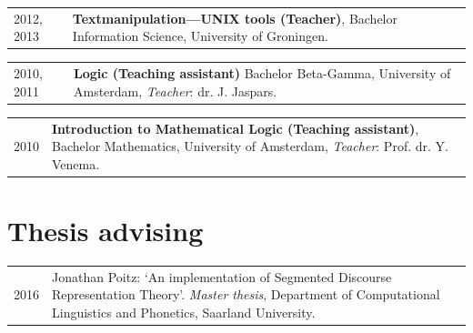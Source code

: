 \documentclass[a4paper,10pt]{article}
\def\leftcolwidth{.12\textwidth}
\def\tablevspace{10pt}
\begin{document}
\noindent
\begin{tabularx}{\textwidth}{ p{\leftcolwidth} X }
  2012, 2013
  & \textbf{Textmanipulation---UNIX tools (Teacher)}, 
    Bachelor Information Science, University of Groningen.\\
\end{tabularx}

\vspace{\tablevspace}

\vspace{\tablevspace}

\noindent
\begin{tabularx}{\textwidth}{ p{\leftcolwidth} X }
  2010, 2011
  & \textbf{Logic (Teaching assistant)}
    Bachelor Beta-Gamma, University of Amsterdam,
    \textit{Teacher}: dr. J. Jaspars.
\end{tabularx}

\vspace{\tablevspace}

\noindent
\begin{tabularx}{\textwidth}{ p{\leftcolwidth} X }
  2010
  & \textbf{Introduction to Mathematical Logic (Teaching assistant)},
    Bachelor Mathematics, University of Amsterdam,
    \textit{Teacher}: Prof. dr. Y. Venema.\\
\end{tabularx}


\section*{Thesis advising}

\noindent
\begin{tabularx}{\textwidth}{ p{\leftcolwidth} X }
  2016
  & Jonathan Poitz: `An implementation of Segmented Discourse
    Representation Theory'. \textit{Master thesis}, Department of Computational
    Linguistics and Phonetics, Saarland University.\\
\end{tabularx}



\end{document}
